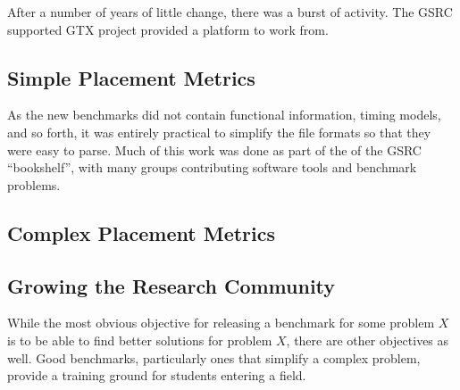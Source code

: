 \documentclass[sigconf]{acmart}
\begin{document}

After a number of years of little change, there was a burst of
activity.  The
GSRC supported GTX project \cite{Caldwell000693} provided a platform
to work from.





\subsection{Simple Placement Metrics}

As the new benchmarks did not contain functional information,
timing models, and so forth, it was entirely practical to
simplify the file formats so that they were easy to parse.
Much of this work was done as part of the of the
GSRC ``bookshelf''\cite{umichbookshelf}, with many groups
contributing software tools and benchmark problems.







\subsection{Complex Placement Metrics}


\subsection{Growing the Research Community}

While the most obvious objective for releasing a benchmark for some
problem $X$ is to be able to find better solutions for problem $X$,
there are other objectives as well.  Good benchmarks, particularly
ones that simplify a complex problem, provide a training ground for
students entering a field.
\end{document}
